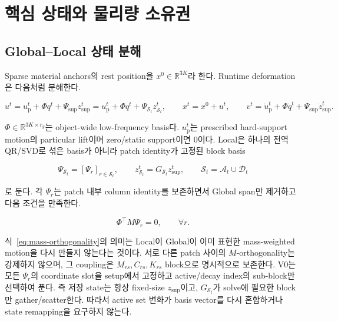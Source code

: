 \documentclass[11pt,a4paper]{article}
\newcommand{\R}{\mathbb{R}}
\begin{document}
\section{핵심 상태와 물리량 소유권}

\subsection{Global--Local 상태 분해}

Sparse material anchors의 rest position을 \(x^0\in\R^{3K}\)라 한다.
Runtime deformation은 다음처럼 분해한다.

\begin{equation}
  u^t
  =
  u_{\mathrm p}^t+\Phi q^t
  +
  \Psi_{\mathrm{sup}}z_{\mathrm{sup}}^t
  =u_{\mathrm p}^t+\Phi q^t+\Psi_{\mathcal S_t}z_{\mathcal S_t}^t,
  \qquad
  x^t=x^0+u^t,
  \qquad
  v^t=\dot u_{\mathrm p}^t+\Phi\dot q^t+\Psi_{\mathrm{sup}}\dot z_{\mathrm{sup}}^t.
  \label{eq:state-decomposition}
\end{equation}

\(\Phi\in\R^{3K\times r_g}\)는 object-wide low-frequency basis다.
\(u_{\mathrm p}^t\)는 prescribed hard-support motion의 particular lift이며
zero/static support이면 0이다.
Local은 하나의 전역 QR/SVD로 섞은 basis가 아니라
patch identity가 고정된 block basis

\begin{equation}
  \Psi_{\mathcal S_t}
  =
  [\Psi_r]_{r\in\mathcal S_t},
  \qquad
  z_{\mathcal S_t}^t=G_{\mathcal S_t}z_{\mathrm{sup}}^t,
  \qquad
  \mathcal S_t=\mathcal A_t\cup\mathcal D_t
\end{equation}

로 둔다. 각 \(\Psi_r\)는 patch 내부 column identity를 보존하면서
Global span만 제거하고 다음 조건을 만족한다.

\begin{equation}
  \Phi^\top M\Psi_r=0,
  \qquad \forall r.
  \label{eq:mass-orthogonality}
\end{equation}

식~\eqref{eq:mass-orthogonality}의 의미는 Local이 Global이 이미 표현한
mass-weighted motion을 다시 만들지 않는다는 것이다.
서로 다른 patch 사이의 \(M\)-orthogonality는 강제하지 않으며,
그 coupling은 \(M_{rs},C_{rs},K_{rs}\) block으로 명시적으로 보존한다.
V0는 모든 \(\Psi_r\)의 coordinate slot을 setup에서 고정하고
active/decay index의 sub-block만 선택하여 푼다.
즉 저장 state는 항상 fixed-size \(z_{\mathrm{sup}}\)이고,
\(G_{\mathcal S_t}\)가 solve에 필요한 block만 gather/scatter한다.
따라서 active set 변화가 basis vector를 다시 혼합하거나 state remapping을 요구하지 않는다.
\end{document}

